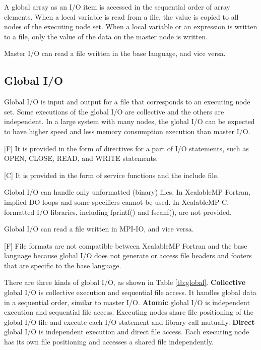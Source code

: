   A global array as an I/O item is accessed in the sequential order of
  array elements.
  When a local variable is read from a file, the value is copied to all
  nodes of the executing node set.
  When a local variable or an expression is written to a file, only the
  value of the data on the master node is written.
  
  Master I/O can read a file written in the base language, and vice
  versa.
  

  \subsection{Global I/O}

  Global I/O is input and output for a file that corresponds to
  an executing node set.
  Some executions of the global I/O are collective and the others are independent.
  In a large system with many nodes, the global I/O can be expected to
  have higher speed and less memory consumption execution than master I/O.

  [F] It is provided in the form of directives for a part of I/O
  statements, such as OPEN, CLOSE, READ, and WRITE statements.

  [C] It is provided in the form of service functions and the include file.

  Global I/O can handle only unformatted (binary) files. In XcalableMP Fortran,
  implied DO loops and some specifiers cannot be used.
  In XcalableMP C, formatted I/O libraries, including fprintf() and fscanf(), are not provided.

  Global I/O can read a file written in MPI-IO, and vice versa. 

  [F] File formats are not compatible between XcalableMP Fortran
  and the base language because global I/O does not generate or access
  file headers and footers that are specific to the base language.

  There are three kinds of global I/O, as shown in Table
  \ref{tb:global}.
  {\bf Collective} global I/O is collective execution and
  sequential file access.
  It handles global data in a sequential order, similar to master
  I/O.
  {\bf Atomic} global I/O is independent execution and sequential file access.
  Executing nodes share file positioning of the global I/O file and
  execute each I/O statement and library call mutually.
  {\bf Direct} global I/O is independent execution and direct file access.
  Each executing node has its own file positioning and accesses a shared
  file independently.

